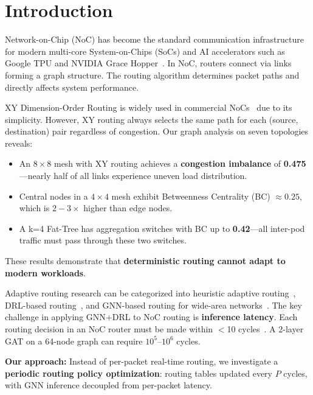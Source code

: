 \documentclass[conference]{IEEEtran}
\begin{document}
\section{Introduction}
\label{sec:intro}

Network-on-Chip (NoC) has become the standard communication infrastructure for modern multi-core System-on-Chips (SoCs) and AI accelerators such as Google TPU and NVIDIA Grace Hopper~\cite{mirhoseini2021}. In NoC, routers connect via links forming a graph structure. The routing algorithm determines packet paths and directly affects system performance.

XY Dimension-Order Routing is widely used in commercial NoCs~\cite{wang2022maar} due to its simplicity. However, XY routing always selects the same path for each (source, destination) pair regardless of congestion. Our graph analysis on seven topologies reveals:

\begin{itemize}
    \item An $8\times8$ mesh with XY routing achieves a \textbf{congestion imbalance} of \textbf{0.475}---nearly half of all links experience uneven load distribution.
    \item Central nodes in a $4\times4$ mesh exhibit Betweenness Centrality (BC) $\approx 0.25$, which is $2-3\times$ higher than edge nodes.
    \item A k=4 Fat-Tree has aggregation switches with BC up to \textbf{0.42}---all inter-pod traffic must pass through these two switches.
\end{itemize}

These results demonstrate that \textbf{deterministic routing cannot adapt to modern workloads}.

Adaptive routing research can be categorized into heuristic adaptive routing~\cite{dyad2004,ebrahimi2019}, DRL-based routing~\cite{wang2022maar,deepnr2022}, and GNN-based routing for wide-area networks~\cite{g-routing2023}. The key challenge in applying GNN+DRL to NoC routing is \textbf{inference latency}. Each routing decision in an NoC router must be made within $<$10 cycles~\cite{wang2022maar}. A 2-layer GAT on a 64-node graph can require $10^5$--$10^6$ cycles.

\textbf{Our approach:} Instead of per-packet real-time routing, we investigate a \textbf{periodic routing policy optimization}: routing tables updated every $P$ cycles, with GNN inference decoupled from per-packet latency.
\end{document}
